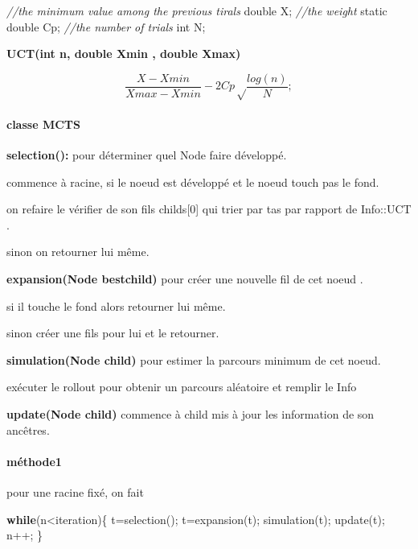 \documentclass[]{article}
\newenvironment{Shaded}{}{}
\newcommand{\AttributeTok}[1]{\textcolor[rgb]{0.49,0.56,0.16}{#1}}
\newcommand{\CommentTok}[1]{\textcolor[rgb]{0.38,0.63,0.69}{\textit{#1}}}
\newcommand{\ControlFlowTok}[1]{\textcolor[rgb]{0.00,0.44,0.13}{\textbf{#1}}}
\newcommand{\DataTypeTok}[1]{\textcolor[rgb]{0.56,0.13,0.00}{#1}}
\newcommand{\NormalTok}[1]{#1}
\let\oldparagraph\paragraph
\renewcommand{\paragraph}[1]{\oldparagraph{#1}\mbox{}}
\begin{document}
\begin{Shaded}
\begin{Highlighting}[]
\CommentTok{//the minimum value among the previous tirals}
\DataTypeTok{double}\NormalTok{ X;}
\CommentTok{//the weight}
\AttributeTok{static} \DataTypeTok{double}\NormalTok{ Cp;}
\CommentTok{//the number of trials }
\DataTypeTok{int}\NormalTok{ N;}
\end{Highlighting}
\end{Shaded}

\textbf{UCT(int n, double Xmin , double Xmax)}

\[\frac{X - Xmin} {Xmax - Xmin} - 2 Cp \sqrt\frac{log(n) }{ N};\]

\hypertarget{classe-mcts}{%
\paragraph{classe MCTS}\label{classe-mcts}}

\textbf{selection():} pour déterminer quel Node faire développé.

commence à racine, si le noeud est développé et le noeud touch pas le
fond.

on refaire le vérifier de son fils childs{[}0{]} qui trier par tas par
rapport de Info::UCT .

sinon on retourner lui même.

\textbf{expansion(Node bestchild)} pour créer une nouvelle fil de cet
noeud .

si il touche le fond alors retourner lui même.

sinon créer une fils pour lui et le retourner.

\textbf{simulation(Node child)} pour estimer la parcours minimum de cet
noeud.

exécuter le rollout pour obtenir un parcours aléatoire et remplir le
Info

\textbf{update(Node child)} commence à child mis à jour les information
de son ancêtres.

\hypertarget{muxe9thode1}{%
\paragraph{méthode1}\label{muxe9thode1}}

pour une racine fixé, on fait

\begin{Shaded}
\begin{Highlighting}[]
\ControlFlowTok{while}\NormalTok{(n<iteration)\{}
\NormalTok{        t=selection();}
\NormalTok{        t=expansion(t);}
\NormalTok{        simulation(t);}
\NormalTok{        update(t);}
\NormalTok{        n++;}
\NormalTok{    \}}
\end{Highlighting}
\end{Shaded}
\end{document}

